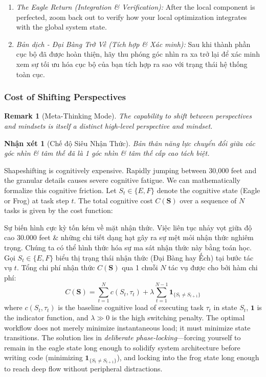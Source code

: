 \documentclass{article}
\newtheorem{remark}{Remark}
\newtheorem{nhanxet}{Nhận xét}
\begin{document}
\begin{enumerate}[label=\emph{\arabic*.}]
	\item \emph{The Eagle Return (Integration \& Verification):} After the local component is perfected, zoom back out to verify how your local optimization integrates with the global system state.
	
	\item \emph{Bản dịch - Đại Bàng Trở Về (Tích hợp \& Xác minh):} Sau khi thành phần cục bộ đã được hoàn thiện, hãy thu phóng góc nhìn ra xa trở lại để xác minh xem sự tối ưu hóa cục bộ của bạn tích hợp ra sao với trạng thái hệ thống toàn cục.
\end{enumerate}

\subsubsection{Cost of Shifting Perspectives}

\begin{remark}[Meta-Thinking Mode]
	The capability to shift between perspectives and mindsets is itself a distinct high-level perspective and mindset.
\end{remark}
\begin{nhanxet}[Chế độ Siêu Nhận Thức]
	Bản thân năng lực chuyển đổi giữa các góc nhìn \& tâm thế đã là 1 góc nhìn \& tâm thế cấp cao tách biệt.
\end{nhanxet}

Shapeshifting is cognitively expensive. Rapidly jumping between 30,000 feet and the granular details causes severe cognitive fatigue. We can mathematically formalize this cognitive friction. Let $S_t \in \{E, F\}$ denote the cognitive state (Eagle or Frog) at task step $t$. The total cognitive cost $C(\mathbf{S})$ over a sequence of $N$ tasks is given by the cost function:

Sự biến hình cực kỳ tốn kém về mặt nhận thức. Việc liên tục nhảy vọt giữa độ cao 30.000 feet \& những chi tiết dạng hạt gây ra sự mệt mỏi nhận thức nghiêm trọng. Chúng ta có thể hình thức hóa sự ma sát nhận thức này bằng toán học. Gọi $S_t \in \{E, F\}$ biểu thị trạng thái nhận thức (Đại Bàng hay Ếch) tại bước tác vụ $t$. Tổng chi phí nhận thức $C(\mathbf{S})$ qua 1 chuỗi $N$ tác vụ được cho bởi hàm chi phí:
\begin{equation}
	C(\mathbf{S}) = \sum_{t=1}^{N} c(S_t, \tau_t) + \lambda \sum_{t=1}^{N-1} \mathbf{1}_{\{S_t \neq S_{t+1}\}}
\end{equation}
where $c(S_t, \tau_t)$ is the baseline cognitive load of executing task $\tau_t$ in state $S_t$, $\mathbf{1}$ is the indicator function, and $\lambda \gg 0$ is the high switching penalty. The optimal workflow does not merely minimize instantaneous load; it must minimize state transitions. The solution lies in \textit{deliberate phase-locking}---forcing yourself to remain in the eagle state long enough to solidify system architecture before writing code (minimizing $\mathbf{1}_{\{S_t \neq S_{t+1}\}}$), and locking into the frog state long enough to reach deep flow without peripheral distractions.
\end{document}
